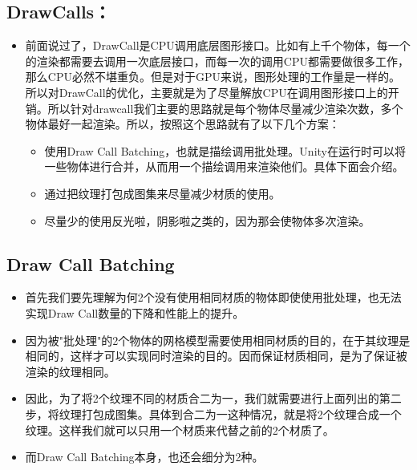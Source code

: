 \documentclass[9pt, b5paper]{article}
\begin{document}
\subsection{DrawCalls：}
\label{sec:orgb31cbd5}
\begin{itemize}
\item 前面说过了，DrawCall是CPU调用底层图形接口。比如有上千个物体，每一个的渲染都需要去调用一次底层接口，而每一次的调用CPU都需要做很多工作，那么CPU必然不堪重负。但是对于GPU来说，图形处理的工作量是一样的。所以对DrawCall的优化，主要就是为了尽量解放CPU在调用图形接口上的开销。所以针对drawcall我们主要的思路就是每个物体尽量减少渲染次数，多个物体最好一起渲染。所以，按照这个思路就有了以下几个方案：
\begin{itemize}
\item 使用Draw Call Batching，也就是描绘调用批处理。Unity在运行时可以将一些物体进行合并，从而用一个描绘调用来渲染他们。具体下面会介绍。
\item 通过把纹理打包成图集来尽量减少材质的使用。
\item 尽量少的使用反光啦，阴影啦之类的，因为那会使物体多次渲染。
\end{itemize}
\end{itemize}
\subsection{Draw Call Batching}
\label{sec:orge56cb96}
\begin{itemize}
\item 首先我们要先理解为何2个没有使用相同材质的物体即使使用批处理，也无法实现Draw Call数量的下降和性能上的提升。
\item 因为被"批处理"的2个物体的网格模型需要使用相同材质的目的，在于其纹理是相同的，这样才可以实现同时渲染的目的。因而保证材质相同，是为了保证被渲染的纹理相同。
\item 因此，为了将2个纹理不同的材质合二为一，我们就需要进行上面列出的第二步，将纹理打包成图集。具体到合二为一这种情况，就是将2个纹理合成一个纹理。这样我们就可以只用一个材质来代替之前的2个材质了。
\item 而Draw Call Batching本身，也还会细分为2种。
\end{itemize}
\end{document}
